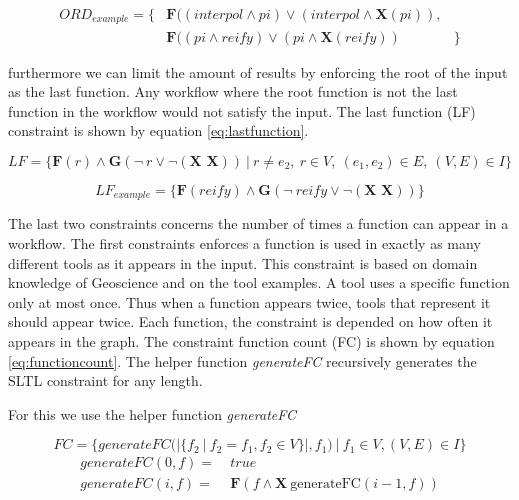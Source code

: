 \documentclass{article}
\begin{document}
\begin{align*}
    ORD_{example} = \{ & \textbf{F}((interpol \wedge pi) \vee (interpol \wedge \textbf{X} (pi)  ), \\
    &\textbf{F}((pi \wedge reify) \vee (pi \wedge \textbf{X} (reify)  ) &
    \}  
\end{align*}

furthermore we can limit the amount of results by enforcing the root of the input as the last function. Any workflow where the root function is not the last function in the workflow would not satisfy the input. The last function (LF) constraint is shown by equation \ref{eq:lastfunction}. 


\begin{equation}
    LF = \{ \textbf{F} (r) \wedge \textbf{G} ( \neg\ r \vee \neg (\textbf{X X})) \ |\ r \not = e_2,\ r \in V,\ (e_1, e_2) \in E,\  (V,E) \in  I
    \}
    \label{eq:lastfunction}
\end{equation}

\begin{equation*}
    LF_{example} = \{ \textbf{F} (reify) \wedge \textbf{G} ( \neg\ reify \vee \neg (\textbf{X X})) \}
\end{equation*}

The last two constraints concerns the number of times a function can appear in a workflow. The first constraints enforces a function is used in exactly as many different tools as it appears in the input. This constraint is based on domain knowledge of Geoscience and on the tool examples. A tool uses a specific function only at most once. Thus when a function appears twice, tools that represent it should appear twice. Each function, the constraint is depended on how often it appears in the graph. The constraint function count (FC) is shown by equation \ref{eq:functioncount}. The helper function \textit{ generateFC} recursively generates the SLTL constraint for any length. 

For this we use the helper function \textit{generateFC} 

\begin{equation}
    FC = \{   generateFC(|\{ f_2\ |\ f_2 = f_1, f_2 \in V \}|, f_1)\ |\ f_1 \in V, (V,E) \in  I \} \label{eq:functioncount}
\end{equation}
\begin{align*}
    generateFC(0,f) =&\ true \\
    generateFC(i,f) =&\ \textbf{F}(f \wedge \textbf{X}\ \text{generateFC}(i-1,f))
\end{align*}
\end{document}
